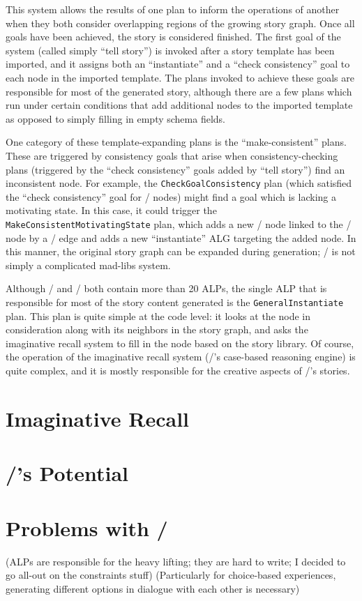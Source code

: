 This system allows the results of one plan to inform the operations of another when they both consider overlapping regions of the growing story graph.
%
Once all goals have been achieved, the story is considered finished.
%
The first goal of the system (called simply ``tell story'') is invoked after a story template has been imported, and it assigns both an ``instantiate'' and a ``check consistency'' goal to each node in the imported template.
%
The plans invoked to achieve these goals are responsible for most of the generated story, although there are a few plans which run under certain conditions that add additional nodes to the imported template as opposed to simply filling in empty schema fields.


One category of these template-expanding plans is the ``make-consistent'' plans.
%
These are triggered by consistency goals that arise when consistency-checking plans (triggered by the ``check consistency'' goals added by ``tell story'') find an inconsistent node.
%
For example, the \texttt{CheckGoalConsistency} plan (which satisfied the ``check consistency'' goal for \gng/ nodes) might find a goal which is lacking a motivating state.
%
In this case, it could trigger the \texttt{MakeConsistentMotivatingState} plan, which adds a new \gns/ node linked to the \gng/ node by a \gem/ edge and adds a new ``instantiate'' ALG targeting the added node.
%
In this manner, the original story graph can be expanded during generation; \minstrel/ is not simply a complicated mad-libs system.


Although \minstrel/ and \skald/ both contain more than 20 ALPs, the single ALP that is responsible for most of the story content generated is the \texttt{GeneralInstantiate} plan.
%
This plan is quite simple at the code level: it looks at the node in consideration along with its neighbors in the story graph, and asks the imaginative recall system to fill in the node based on the story library.
%
Of course, the operation of the imaginative recall system (\misntrel/'s case-based reasoning engine) is quite complex, and it is mostly responsible for the creative aspects of \minstrel/'s stories.


\section{Imaginative Recall}



\section{\minstrel/'s Potential}

\section{Problems with \problemplanets/}

\label{sct:problem-planets-problems}

(ALPs are responsible for the heavy lifting; they are hard to write; I decided to go all-out on the constraints stuff)
(Particularly for choice-based experiences, generating different options in dialogue with each other is necessary)
